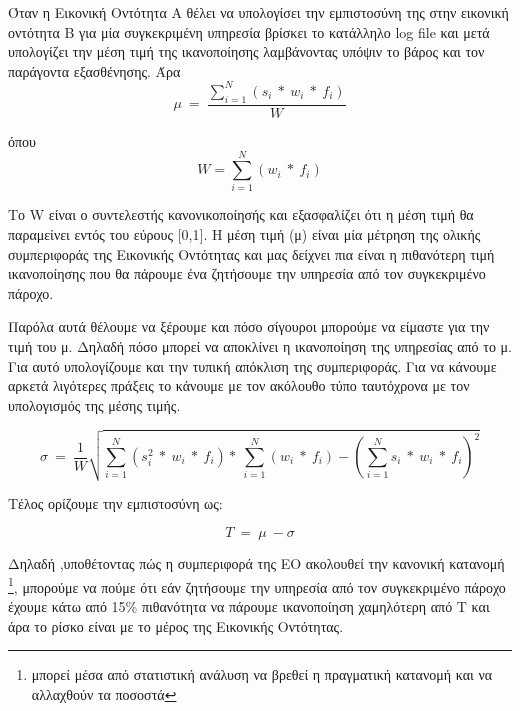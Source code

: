 \newpage
Όταν η Εικονική Οντότητα Α θέλει να υπολογίσει την εμπιστοσύνη της στην εικονική οντότητα Β για μία συγκεκριμένη υπηρεσία βρίσκει το κατάλληλο log file και μετά υπολογίζει την μέση τιμή της ικανοποίησης λαμβάνοντας υπόψιν το βάρος και τον παράγοντα εξασθένησης. Άρα 
\begin{equation}
 \mu\  =\ \frac{\sum_{i=1}^{N}\left(s_i\ *\ w_i\ *\ f_i\right)}{W} 
\end{equation}

όπου 
\begin{equation}
 W = \sum_{i=1}^{N}\left(w_i\ *\ f_i\right)
\end{equation}

Το W είναι ο συντελεστής κανονικοποίησής και εξασφαλίζει ότι η μέση τιμή θα παραμείνει εντός του εύρους [0,1]. Η μέση τιμή (μ) είναι μία μέτρηση της ολικής συμπεριφοράς της Εικονικής Οντότητας και μας δείχνει πια είναι η πιθανότερη τιμή ικανοποίησης που θα πάρουμε ένα ζητήσουμε την υπηρεσία από τον συγκεκριμένο πάροχο.

Παρόλα αυτά θέλουμε να ξέρουμε και πόσο σίγουροι μπορούμε να είμαστε για την τιμή του μ. Δηλαδή πόσο μπορεί να αποκλίνει η ικανοποίηση της υπηρεσίας από το μ. Για αυτό υπολογίζουμε και την τυπική απόκλιση της συμπεριφοράς. Για να κάνουμε αρκετά λιγότερες πράξεις το κάνουμε με τον ακόλουθο τύπο ταυτόχρονα με τον υπολογισμός της μέσης τιμής.

\begin{equation}
 \sigma\  =\ \frac{1}{W} \sqrt{\sum_{i=1}^{N}\left(s_i^2\ *\ w_i\ *\ f_i\right)* \ \sum_{i=1}^{N} \left(w_i\ * \ f_i \right)- \left( \sum_{i=1}^{N} s_i\ *\ w_i\ *\ f_i\right)^2}
\end{equation}

Τέλος ορίζουμε την εμπιστοσύνη ως:

\begin{equation}
 T \ = \ \mu \ - \sigma 
\end{equation}

Δηλαδή ,υποθέτοντας πώς η συμπεριφορά της ΕΟ ακολουθεί την κανονική κατανομή \footnote{μπορεί μέσα από στατιστική ανάλυση να βρεθεί η πραγματική κατανομή και να αλλαχθούν τα ποσοστά}, μπορούμε να πούμε ότι εάν ζητήσουμε την υπηρεσία από τον συγκεκριμένο πάροχο έχουμε κάτω από 15\% πιθανότητα να πάρουμε ικανοποίηση χαμηλότερη από Τ και άρα το ρίσκο είναι με το μέρος της Εικονικής Οντότητας.

